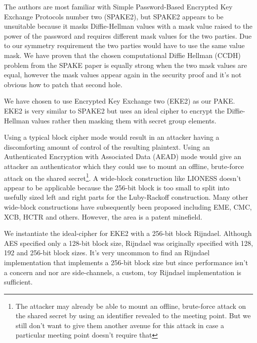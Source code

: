 \documentclass[letterpaper,twocolumn,10pt]{article}
\begin{document}
The authors are most familiar with Simple Password-Based Encrypted Key Exchange
Protocols number two (SPAKE2)\cite{abdalla2005simple}, but SPAKE2 appears to be
unsuitable because it masks Diffie-Hellman values with a mask value raised to
the power of the password and requires different mask values for the two
parties. Due to our symmetry requirement the two parties would have to use the
same value mask. We have proven that the chosen computational Diffie Hellman
(CCDH) problem from the SPAKE paper is equally strong when the two mask values
are equal, however the mask values appear again in the security proof and it's
not obvious how to patch that second hole.

We have chosen to use Encrypted Key Exchange two
(EKE2)\cite{bellare2000authenticated} as our PAKE. EKE2 is very similar to
SPAKE2 but uses an ideal cipher to encrypt the Diffie-Hellman values rather
then masking them with secret group elements.

Using a typical block cipher mode would
result in an attacker having a discomforting amount of control of the resulting
plaintext. Using an Authenticated Encryption with Associated Data (AEAD) mode
would give an attacker an authenticator which they could use to mount an
offline, brute-force attack on the shared secret\footnote{The attacker may
already be able to mount an offline, brute-force attack on the shared secret by
using an identifier revealed to the meeting point. But we still don't want to
give them another avenue for this attack in case a particular meeting point
doesn't require that}. A wide-block
construction like LIONESS\cite{anderson1996two} doesn't appear to be
applicable because the 256-bit block is too small to split into usefully sized
left and right parts for the Luby-Rackoff construction. Many other wide-block
constructions have subsequently been proposed including
EME\cite{halevi2004parallelizable}, CMC\cite{halevi2004parallelizable},
XCB\cite{mcgrew2004extended}, HCTR\cite{wang2005hctr} and others. However, the
area is a patent minefield.

We instantiate the ideal-cipher for EKE2 with a 256-bit block
Rijndael\cite{daemen2002design}. Although AES specified only a 128-bit block
size, Rijndael was originally specified with 128, 192 and 256-bit block sizes.
It's very uncommon to find an Rijndael implementation that implements a 256-bit
block size but since performance isn't a concern and nor are side-channels, a
custom, toy Rijndael implementation is sufficient.
\end{document}
